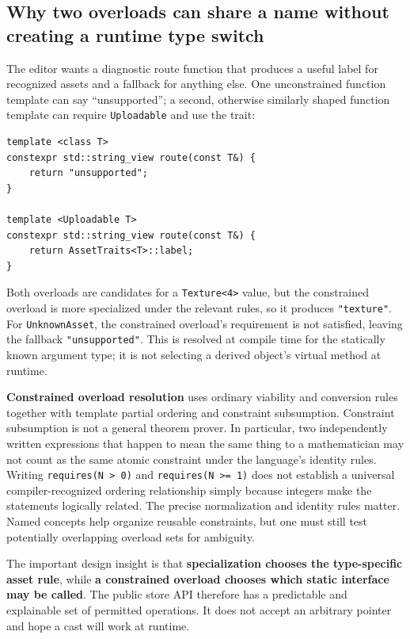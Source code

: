 \subsection{Why two overloads can share a name without creating a runtime type switch}\label{01-foundations-i-ch005-why-two-overloads-can-share-a-name-without-creating-a-runtime-type-switch}

The editor wants a diagnostic route function that produces a useful label for recognized assets and a fallback for anything else. One unconstrained function template can say ``unsupported''; a second, otherwise similarly shaped function template can require \texttt{Uploadable} and use the trait:

\begin{verbatim}
template <class T>
constexpr std::string_view route(const T&) {
    return "unsupported";
}

template <Uploadable T>
constexpr std::string_view route(const T&) {
    return AssetTraits<T>::label;
}
\end{verbatim}

Both overloads are candidates for a \texttt{Texture\textless{}4\textgreater{}} value, but the constrained overload is more specialized under the relevant rules, so it produces \texttt{"texture"}. For \texttt{UnknownAsset}, the constrained overload's requirement is not satisfied, leaving the fallback \texttt{"unsupported"}. This is resolved at compile time for the statically known argument type; it is not selecting a derived object's virtual method at runtime.

\textbf{Constrained overload resolution} uses ordinary viability and conversion rules together with template partial ordering and constraint subsumption. Constraint subsumption is not a general theorem prover. In particular, two independently written expressions that happen to mean the same thing to a mathematician may not count as the same atomic constraint under the language's identity rules. Writing \texttt{requires(N\ \textgreater{}\ 0)} and \texttt{requires(N\ \textgreater{}=\ 1)} does not establish a universal compiler-recognized ordering relationship simply because integers make the statements logically related. The precise normalization and identity rules matter. Named concepts help organize reusable constraints, but one must still test potentially overlapping overload sets for ambiguity.

The important design insight is that \textbf{specialization chooses the type-specific asset rule}, while \textbf{a constrained overload chooses which static interface may be called}. The public store API therefore has a predictable and explainable set of permitted operations. It does not accept an arbitrary pointer and hope a cast will work at runtime.


